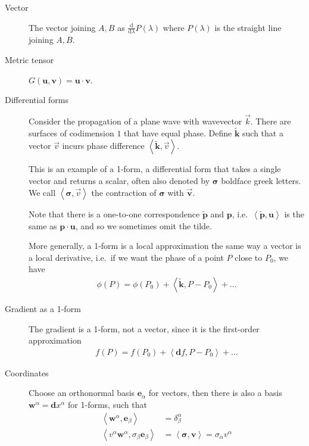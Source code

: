 \documentclass[12pt]{report}
\newcommand{\rd}[2]{\frac{\mathrm{d}#1}{\mathrm{d}#2}}
\newcommand{\expvalue}[1]{\left<#1\right>}
\begin{document}
\begin{description}
    \item[Vector] The vector joining $A,B$ as $\rd{}{\lambda}P(\lambda)$ where
        $P(\lambda)$ is the straight line joining $A,B$.

    \item[Metric tensor] $G(\mathbf{u}, \mathbf{v}) = \mathbf{u} \cdot
        \mathbf{v}$.

    \item[Differential forms] Consider the propagation of a plane wave with
        wavevector $\vec{k}$. There are surfaces of codimension $1$ that have
        equal phase. Define $\mathbf{\tilde{k}}$ such that a vector $\vec{v}$
        incurs phase difference $\expvalue{\mathbf{\tilde{k}}, \vec{v}}$.

        This is an example of a 1-form, a differential form that takes a single
        vector and returns a scalar, often also denoted by $\mathbf{\sigma}$
        boldface greek letters. We call $\expvalue{\mathbf{\sigma}, \vec{v}}$
        the contraction of $\mathbf{\sigma}$ with $\mathbf{\vec{v}}$.

        Note that there is a one-to-one correspondence $\mathbf{\tilde{p}}$ and
        $\mathbf{p}$, i.e.\ $\expvalue{\mathbf{\tilde{p}}, \mathbf{u}}$ is the
        same as $\mathbf{p} \cdot \mathbf{u}$, and so we sometimes omit the
        tilde.

        More generally, a 1-form is a local approximation the same way a vector
        is a local derivative, i.e.\ if we want the phase of a point $P$ close
        to $P_0$, we have
        \begin{align}
            \phi(P) = \phi(P_0) + \expvalue{\mathbf{\tilde{k}}, P - P_0} + \dots
        \end{align}

    \item[Gradient as a 1-form] The gradient is a 1-form, not a vector, since it
        is the first-order approximation
        \begin{align}
            f(P) = f(P_0) + \expvalue{\mathbf{d}f, P - P_0} +\dots
        \end{align}

    \item[Coordinates] Choose an orthonormal basis $\mathbf{e}_\alpha$ for
        vectors, then there is also a basis $\mathbf{w}^\alpha =
        \mathbf{d}x^\alpha$ for 1-forms, such that
        \begin{align}
            \expvalue{\mathbf{w}^\alpha, \mathbf{e}_\beta} &=
                \delta^\alpha_\beta\\
            \expvalue{v^\alpha \mathbf{w}^\alpha, \sigma_\beta \mathbf{e}_\beta}
                &= \expvalue{\mathbf{\sigma}, \mathbf{v}} = \sigma_\alpha
                v^\alpha
        \end{align}


\end{description}
\end{document}
